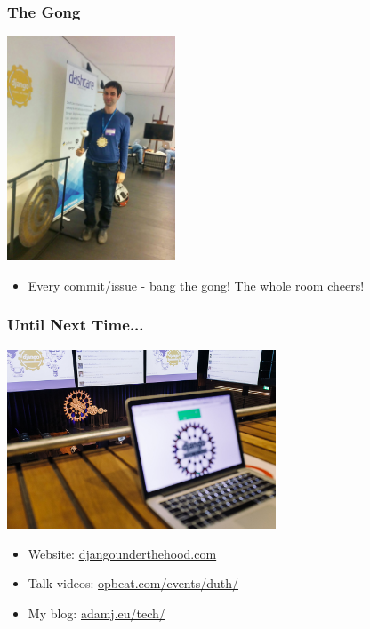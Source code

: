 \documentclass{beamer}
\begin{document}
\begin{frame}[fragile]\frametitle{The Gong}

    \begin{center}
        \includegraphics[width=5cm]{duth-sprints-lukasz-gong}
    \end{center}

    \begin{itemize}
        \item Every commit/issue - bang the gong! The whole room cheers!
    \end{itemize}

\end{frame}


\begin{frame}[fragile]\frametitle{Until Next Time...}

    \begin{center}
        \includegraphics[width=8cm]{duth-the-end}
    \end{center}

    \begin{itemize}
        \item Website: \url{djangounderthehood.com}
        \item Talk videos: \url{opbeat.com/events/duth/}
        \item My blog: \url{adamj.eu/tech/}
    \end{itemize}

\end{frame}
\end{document}
